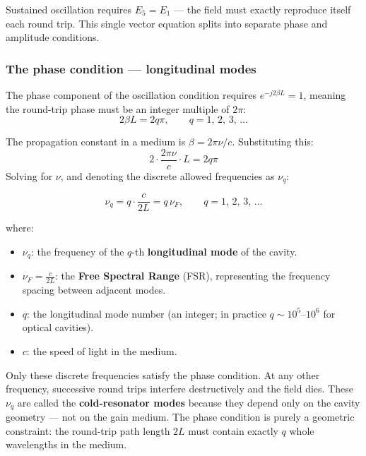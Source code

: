 Sustained oscillation requires $E_5 = E_1$ --- the field must exactly reproduce itself each round trip. This single vector equation splits into separate phase and amplitude conditions.

\subsubsection{The phase condition --- longitudinal modes}

The phase component of the oscillation condition requires $e^{-j2\beta L} = 1$, meaning the round-trip phase must be an integer multiple of $2\pi$:
\begin{equation*}
    2\beta L = 2q\pi, \qquad q = 1,\,2,\,3,\,\ldots
\end{equation*}

The propagation constant in a medium is $\beta = 2\pi\nu/c$. Substituting this:
\begin{equation*}
    2\cdot\frac{2\pi\nu}{c}\cdot L = 2q\pi
\end{equation*}
Solving for $\nu$, and denoting the discrete allowed frequencies as $\nu_q$:
\begin{keyresult}
    \begin{equation}
        \nu_q = q\cdot\frac{c}{2L} = q\,\nu_F, \qquad q = 1,\,2,\,3,\,\ldots
    \end{equation}
\end{keyresult}
where:
\begin{itemize}
    \item $\nu_q$: the frequency of the $q$-th \textbf{longitudinal mode} of the cavity.
    \item $\nu_F = \frac{c}{2L}$: the \textbf{Free Spectral Range} (FSR), representing the frequency spacing between adjacent modes.
    \item $q$: the longitudinal mode number (an integer; in practice $q \sim 10^5$--$10^6$ for optical cavities).
    \item $c$: the speed of light in the medium.
\end{itemize}

Only these discrete frequencies satisfy the phase condition. At any other frequency, successive round trips interfere destructively and the field dies. These $\nu_q$ are called the \textbf{cold-resonator modes} because they depend only on the cavity geometry --- not on the gain medium. The phase condition is purely a geometric constraint: the round-trip path length $2L$ must contain exactly $q$ whole wavelengths in the medium.

